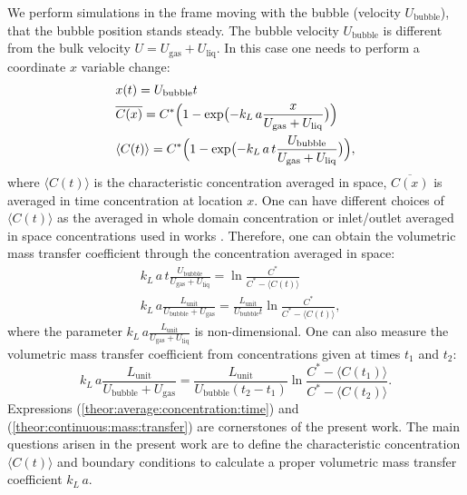 \documentclass{article}
\newcommand{\beq}{\begin{equation}}
\newcommand{\feq}{\end{equation}}
\newcommand{\beqal}{\begin{equation}\begin{aligned}}
\newcommand{\feqal}{\end{aligned}\end{equation}}
\newcommand{\vol}{k_L\,a}
\newcommand{\lunit}{L_{\mathrm{unit}}}
\newcommand{\ububble}{U_{\mathrm{bubble}}}
\newcommand{\uliq}{U_{\mathrm{liq}}}
\newcommand{\ugas}{U_{\mathrm{gas}}}
\newcommand{\cstar}{C^{*}}
\newcommand{\volnondim}{\vol \frac{\lunit}{\ububble+\ugas}}
\begin{document}
We perform simulations in the frame moving with the bubble (velocity
$\ububble$), that the bubble position stands steady. The bubble velocity $\ububble$ is
different from the bulk velocity $U=\ugas+\uliq$. In this case one needs to perform a coordinate $x$
variable change:
\beqal
\label{theor:average:concentration:time}
&x(t)=\ububble t\\
&\overline{C(x)}=\cstar \Bigl(1-\exp\bigl(-\vol \frac{x}{\ugas+\uliq}\bigr)\Bigr)\\
&\langle C(t)\rangle=\cstar \Bigl(1-\exp\bigl(-\vol\, t \frac{\ububble}{\ugas+\uliq}\bigr)\Bigr),
\feqal
where $\langle C(t)\rangle$ is the characteristic concentration averaged in space, $\overline{C(x)}$ is averaged in time concentration at location $x$. 
One can have different choices of
$\langle C(t) \rangle$ as the averaged in whole domain concentration or inlet/outlet averaged in
space concentrations used in works \cite{vanbaten-circular,kreutzer-overview}.  
Therefore, one can obtain the volumetric mass transfer coefficient through the concentration averaged in space:
\beqal
\label{theor:one:concentration:time}
&\vol\, t \frac{\ububble}{\ugas+\uliq}=\ln \frac{\cstar}{\cstar-\langle C(t)\rangle}\\
&\volnondim=\frac{\lunit}{\ububble t}\ln \frac{\cstar}{\cstar-\langle C(t) \rangle},
\feqal
where the parameter $\vol \frac{\lunit}{\ugas+\uliq}$ is non-dimensional. One can also measure the
volumetric mass transfer coefficient from concentrations given at times $t_1$ and $t_2$:
\beq
\label{theor:continuous:mass:transfer}
\volnondim=\frac{\lunit}{\ububble
(t_2-t_1)}\ln\frac{C^{*}-\langle C(t_1) \rangle}{C^{*}-\langle C(t_2) \rangle}.
\feq
Expressions (\ref{theor:average:concentration:time}) and (\ref{theor:continuous:mass:transfer}) are
cornerstones of the present work. The main questions arisen in the present work are to define the
characteristic concentration $\langle C(t) \rangle$ and  boundary conditions to calculate a proper
volumetric mass transfer coefficient
$\vol$. 
  
\end{document}
